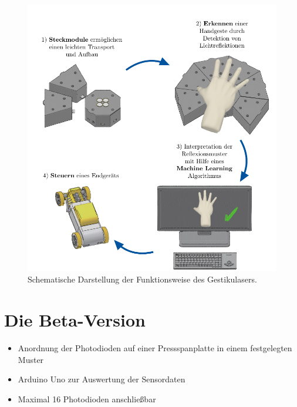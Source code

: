 ﻿\documentclass{sciposter}
\begin{document}
\begin{multicols}{3}
\begin{figure}[h]
	\centering
	\includegraphics[scale=1.3]{../figures/tikz/GestikulaserAblauf.pdf}
	\caption{Schematische Darstellung der Funktionsweise des Gestikulasers.}
	\label{fig:FunktionsweiseGestikulaser}
\end{figure}


\section{Die Beta-Version}

\begin{itemize}
	\item Anordnung der Photodioden auf einer Pressspanplatte in einem festgelegten Muster
	\item Arduino Uno zur Auswertung der Sensordaten
	\item Maximal 16 Photodioden anschließbar
\end{itemize}


\end{multicols}
\end{document}
